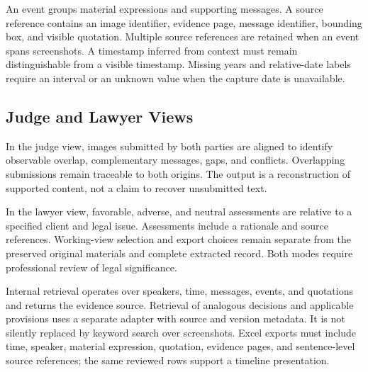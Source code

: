 \documentclass[11pt]{article}
\begin{document}
An event groups material expressions and supporting messages. A source reference contains an image identifier, evidence page, message identifier, bounding box, and visible quotation. Multiple source references are retained when an event spans screenshots. A timestamp inferred from context must remain distinguishable from a visible timestamp. Missing years and relative-date labels require an interval or an unknown value when the capture date is unavailable.

\subsection{Judge and Lawyer Views}
In the judge view, images submitted by both parties are aligned to identify observable overlap, complementary messages, gaps, and conflicts. Overlapping submissions remain traceable to both origins. The output is a reconstruction of supported content, not a claim to recover unsubmitted text.

In the lawyer view, favorable, adverse, and neutral assessments are relative to a specified client and legal issue. Assessments include a rationale and source references. Working-view selection and export choices remain separate from the preserved original materials and complete extracted record. Both modes require professional review of legal significance.

Internal retrieval operates over speakers, time, messages, events, and quotations and returns the evidence source. Retrieval of analogous decisions and applicable provisions uses a separate adapter with source and version metadata. It is not silently replaced by keyword search over screenshots. Excel exports must include time, speaker, material expression, quotation, evidence pages, and sentence-level source references; the same reviewed rows support a timeline presentation.
\end{document}
